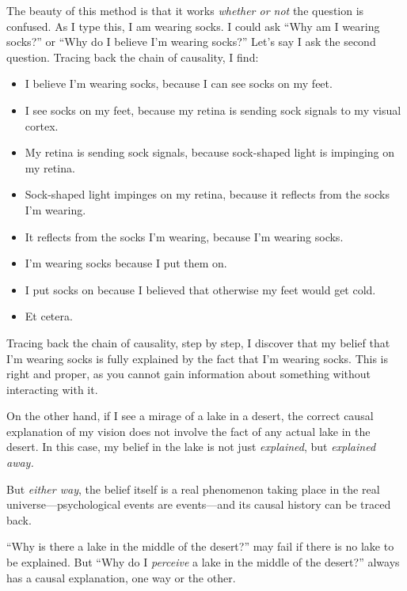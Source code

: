 {
 The beauty of this method is that it works \textit{whether or not}
the question is confused. As I type this, I am wearing socks. I could
ask ``Why am I wearing socks?'' or
``Why do I believe I'm wearing
socks?'' Let's say I ask the second
question. Tracing back the chain of causality, I find:}

\begin{itemize}
\item {
 I believe I'm wearing socks, because I can see
socks on my feet.}

\item {
 I see socks on my feet, because my retina is sending sock signals
to my visual cortex.}

\item {
 My retina is sending sock signals, because sock-shaped light is
impinging on my retina.}

\item {
 Sock-shaped light impinges on my retina, because it reflects from
the socks I'm wearing.}

\item {
 It reflects from the socks I'm wearing, because
I'm wearing socks.}

\item {
 I'm wearing socks because I put them on.}

\item {
 I put socks on because I believed that otherwise my feet would get
cold.}

\item {
  Et cetera.}
\end{itemize}

{
 Tracing back the chain of causality, step by step, I discover that
my belief that I'm wearing socks is fully explained by
the fact that I'm wearing socks. This is right and
proper, as you cannot gain information about something without
interacting with it.}

{
 On the other hand, if I see a mirage of a lake in a desert, the
correct causal explanation of my vision does not involve the fact of
any actual lake in the desert. In this case, my belief in the lake is
not just \textit{explained}, but \textit{explained away.}}

{
 But \textit{either way}, the belief itself is a real phenomenon
taking place in the real universe---psychological events are
events---and its causal history can be traced back.}

{
 ``Why is there a lake in the middle of the
desert?'' may fail if there is no lake to be
explained. But ``Why do I \textit{perceive} a lake in
the middle of the desert?'' always has a causal
explanation, one way or the other.}

